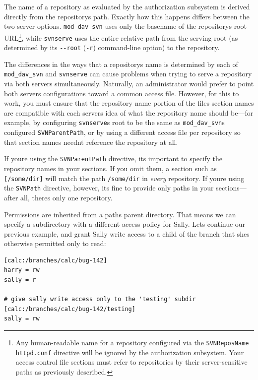 The name of a repository as evaluated by the authorization subsystem is
derived directly from the repository\textquotesingle s path. Exactly how
this happens differs between the two server options.
\texttt{mod\_dav\_svn} uses only the basename of the
repository\textquotesingle s root URL\footnote{Any human-readable name
  for a repository configured via the \texttt{SVNReposName}
  \texttt{httpd.conf} directive will be ignored by the authorization
  subsystem. Your access control file sections must refer to
  repositories by their server-sensitive paths as previously described.},
while \texttt{svnserve} uses the entire relative path from the serving
root (as determined by its \texttt{-\/-root} (\texttt{-r}) command-line
option) to the repository.

The differences in the ways that a repository\textquotesingle s name is
determined by each of \texttt{mod\_dav\_svn} and \texttt{svnserve} can
cause problems when trying to serve a repository via both servers
simultaneously. Naturally, an administrator would prefer to point both
servers\textquotesingle{} configurations toward a common access file.
However, for this to work, you must ensure that the repository name
portion of the file\textquotesingle s section names are compatible with
each server\textquotesingle s idea of what the repository name should
be---for example, by configuring \texttt{svnserve}\textquotesingle s
root to be the same as \texttt{mod\_dav\_svn}\textquotesingle s
configured \texttt{SVNParentPath}, or by using a different access file
per repository so that section names needn\textquotesingle t reference
the repository at all.

If you\textquotesingle re using the \texttt{SVNParentPath} directive,
it\textquotesingle s important to specify the repository names in your
sections. If you omit them, a section such as \texttt{{[}/some/dir{]}}
will match the path \texttt{/some/dir} in \emph{every} repository. If
you\textquotesingle re using the \texttt{SVNPath} directive, however,
it\textquotesingle s fine to provide only paths in your sections---after
all, there\textquotesingle s only one repository.

Permissions are inherited from a path\textquotesingle s parent
directory. That means we can specify a subdirectory with a different
access policy for Sally. Let\textquotesingle s continue our previous
example, and grant Sally write access to a child of the branch that
she\textquotesingle s otherwise permitted only to read:

\begin{verbatim}
[calc:/branches/calc/bug-142]
harry = rw
sally = r

# give sally write access only to the 'testing' subdir
[calc:/branches/calc/bug-142/testing]
sally = rw
\end{verbatim}

